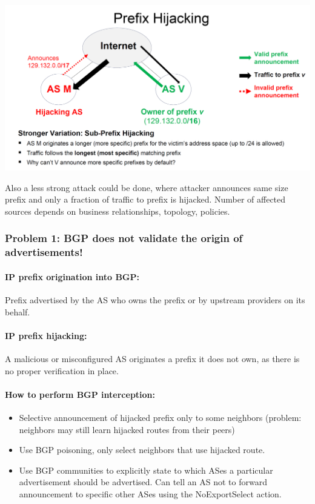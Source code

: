 \begin{minipage}{\linewidth}
    \centering      
    \includegraphics[width=\linewidth]{Figures/BGP_prefix_highjacking.PNG} 
\end{minipage}

Also a less strong attack could be done, where attacker announces same size prefix and only a fraction of traffic to prefix is hijacked. Number of affected sources depends on business relationships, topology, policies.

\subsubsection{Problem 1: BGP does not validate the origin of advertisements!}

\paragraph{IP prefix origination into BGP:} Prefix advertised by the AS who owns the prefix or by upstream providers on its behalf.

\paragraph{IP prefix hijacking:} A malicious or misconfigured AS originates a prefix it does not own, as there is no proper verification in place.

\paragraph{How to perform BGP interception:}
\begin{itemize}
	\item Selective announcement of hijacked prefix only to some neighbors (problem: neighbors may still learn hijacked routes from their peers)
	\item Use BGP poisoning, only select neighbors that use hijacked route.
	\item Use BGP communities to explicitly state to which ASes a particular advertisement should be advertised. Can tell an AS not to forward announcement to specific other ASes using the NoExportSelect action.
\end{itemize}

